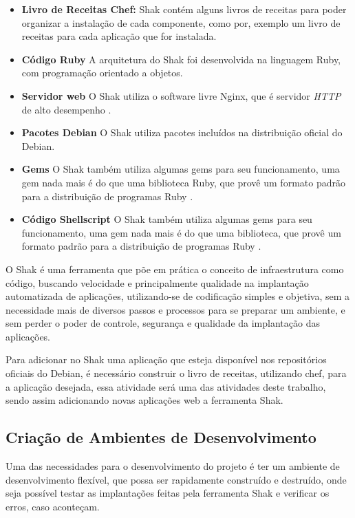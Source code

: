 \begin{itemize}
  \item  \textbf{Livro de Receitas Chef:} Shak contém alguns livros de receitas
  para poder organizar a instalação de cada componente, como por, exemplo um livro
  de receitas para cada aplicação que for instalada.
  \item  \textbf{Código Ruby} A arquitetura do Shak foi desenvolvida na linguagem
  Ruby, com programação orientado a objetos.
  \item  \textbf{Servidor web} O Shak utiliza o software livre Nginx, que é
  servidor \textit{HTTP} de alto desempenho \cite{nginx}.
  \item  \textbf{Pacotes Debian} O Shak utiliza pacotes incluídos na distribuição
  oficial do Debian.
  \item  \textbf{Gems} O Shak também utiliza algumas gems para seu funcionamento,
  uma gem nada mais é do que uma biblioteca Ruby, que provê um formato padrão para
  a distribuição de programas Ruby \cite{gem}.
  \item  \textbf{Código Shellscript} O Shak também utiliza algumas gems para seu funcionamento,
  uma gem nada mais é do que uma biblioteca, que provê um formato padrão para
  a distribuição de programas Ruby \cite{gem}.
\end{itemize}

O Shak é uma ferramenta que põe em prática o conceito de infraestrutura
como código, buscando velocidade e principalmente qualidade na implantação
automatizada de aplicações, utilizando-se de codificação simples e objetiva,
sem a necessidade mais de diversos passos e processos para se preparar um ambiente,
e sem perder o poder de controle, segurança e qualidade da implantação das aplicações.

Para adicionar no Shak uma aplicação que esteja disponível nos repositórios oficiais
do Debian, é necessário construir o livro de receitas, utilizando chef, para a
aplicação desejada, essa atividade será uma das atividades deste trabalho, sendo assim
adicionando novas aplicações web a ferramenta Shak.

\subsection{Criação de Ambientes de Desenvolvimento}

Uma das necessidades para o desenvolvimento do projeto é ter um ambiente de desenvolvimento
flexível, que possa ser rapidamente construído e destruído, onde seja possível 
testar as implantações feitas pela ferramenta Shak e verificar os erros, caso 
aconteçam. 

